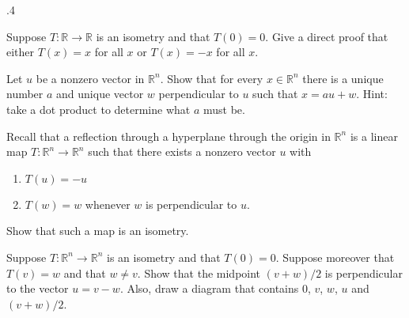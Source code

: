 \documentclass[minion]{homework}
\newcommand{\Reals}{\mathbb{R}}
\begin{document}
\begin{problems}

.4

\problem Suppose $T:\Reals\to \Reals$ is an isometry and that $T(0)=0$.  Give
a direct proof that either $T(x)=x$ for all $x$ or $T(x)=-x$ for all $x$.

\problem Let $u$ be a nonzero vector in $\Reals^n$.  Show that for every
$x\in\Reals^n$ there is a unique number $a$ and unique vector $w$ perpendicular 
to $u$ such that $x=au+w$.  Hint: take a dot product to determine what $a$ must be.

\problem Recall that a reflection through a hyperplane through the origin
in $\Reals^n$ is a linear map $T:\Reals^n\to\Reals^n$ such that
there exists a nonzero vector $u$ with
\begin{enumerate}
  \item $T(u)=-u$
  \item $T(w)=w$ whenever $w$ is perpendicular to $u$.
\end{enumerate}
Show that such a map is an isometry.

\problem Suppose $T:\Reals^n\to\Reals^n$ is an isometry and that $T(0)=0$.
Suppose moreover that $T(v)=w$ and that $w\neq v$. Show that the midpoint 
$(v+w)/2$ is perpendicular to the vector $u=v-w$.  Also, draw a diagram that contains
$0$, $v$, $w$, $u$ and $(v+w)/2$.

\end{problems}
\end{document}
